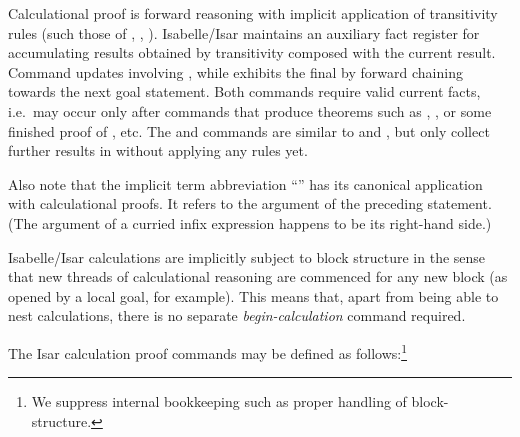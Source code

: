 \begin{isabellebody}
\begin{isamarkuptext}
  Calculational proof is forward reasoning with implicit application
  of transitivity rules (such those of \isa{{\isachardoublequote}{\isacharequal}{\isachardoublequote}}, \isa{{\isachardoublequote}{\isasymle}{\isachardoublequote}},
  \isa{{\isachardoublequote}{\isacharless}{\isachardoublequote}}).  Isabelle/Isar maintains an auxiliary fact register
  \hyperlink{fact.calculation}{\mbox{}} for accumulating results obtained by
  transitivity composed with the current result.  Command \hyperlink{command.also}{\mbox{}} updates \hyperlink{fact.calculation}{\mbox{}} involving \hyperlink{fact.this}{\mbox{}}, while
  \hyperlink{command.finally}{\mbox{}} exhibits the final \hyperlink{fact.calculation}{\mbox{}} by
  forward chaining towards the next goal statement.  Both commands
  require valid current facts, i.e.\ may occur only after commands
  that produce theorems such as \hyperlink{command.assume}{\mbox{}}, \hyperlink{command.note}{\mbox{}}, or some finished proof of \hyperlink{command.have}{\mbox{}}, \hyperlink{command.show}{\mbox{}} etc.  The \hyperlink{command.moreover}{\mbox{}} and \hyperlink{command.ultimately}{\mbox{}}
  commands are similar to \hyperlink{command.also}{\mbox{}} and \hyperlink{command.finally}{\mbox{}},
  but only collect further results in \hyperlink{fact.calculation}{\mbox{}} without
  applying any rules yet.

  Also note that the implicit term abbreviation ``\isa{{\isachardoublequote}{\isasymdots}{\isachardoublequote}}'' has
  its canonical application with calculational proofs.  It refers to
  the argument of the preceding statement. (The argument of a curried
  infix expression happens to be its right-hand side.)

  Isabelle/Isar calculations are implicitly subject to block structure
  in the sense that new threads of calculational reasoning are
  commenced for any new block (as opened by a local goal, for
  example).  This means that, apart from being able to nest
  calculations, there is no separate \emph{begin-calculation} command
  required.

  \medskip The Isar calculation proof commands may be defined as
  follows:\footnote{We suppress internal bookkeeping such as proper
  handling of block-structure.}


\end{isamarkuptext}
\end{isabellebody}
